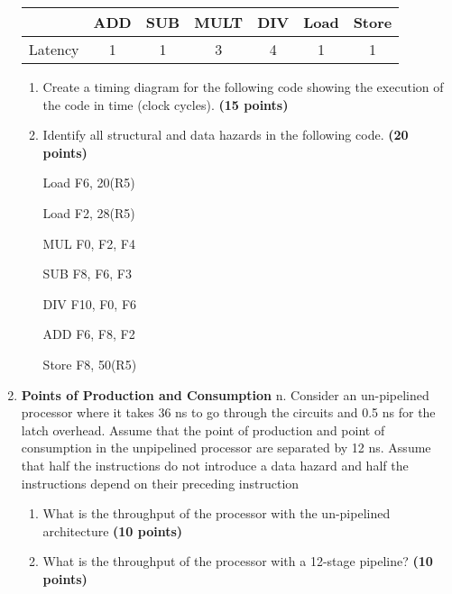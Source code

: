 \documentclass[a4paper, 11pt]{exam}
\begin{document}
\begin{enumerate}
\begin{center}
\begin{tabular}{ |c|c|c|c|c|c|c| } 
 \hline
  & ADD & SUB & MULT & DIV & Load & Store \\ 
  \hline
 Latency & 1 & 1 & 3 & 4 & 1 & 1 \\ 
 \hline
\end{tabular}
\end{center}

\begin{enumerate}
\item Create a timing diagram for the following code showing the execution of the code in time (clock cycles). \textbf{(15 points)}

	\newline

\item Identify all structural and data hazards in the following code. \textbf {(20 points)}

	\newline

\begin {center}
Load F6, 20(R5) 

Load F2, 28(R5)

MUL F0, F2, F4

SUB F8, F6, F3

DIV F10, F0, F6

ADD F6, F8, F2

Store F8, 50(R5)

\end {center}

\end{enumerate}

\item \textbf{Points of Production and Consumption} n. Consider an un-pipelined processor where it takes 36 ns to go through the circuits and 0.5 ns for the latch overhead. Assume that the point of production and point of consumption in the unpipelined processor are separated by 12 ns. Assume that half the instructions do not introduce a data hazard and half the
instructions depend on their preceding instruction

\begin{enumerate}
\item What is the throughput of the processor with the un-pipelined architecture \textbf{(10 points)}

	\newline
\item What is the throughput of the processor with a 12-stage pipeline? \textbf {(10 points)}

	\newline

\end{enumerate}
\end{enumerate}
\end{document}
